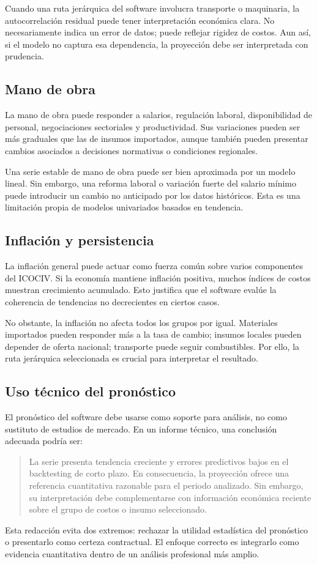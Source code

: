 Cuando una ruta jerárquica del software involucra transporte o maquinaria, la autocorrelación residual puede tener interpretación económica clara. No necesariamente indica un error de datos; puede reflejar rigidez de costos. Aun así, si el modelo no captura esa dependencia, la proyección debe ser interpretada con prudencia.

\subsection{Mano de obra}

La mano de obra puede responder a salarios, regulación laboral, disponibilidad de personal, negociaciones sectoriales y productividad. Sus variaciones pueden ser más graduales que las de insumos importados, aunque también pueden presentar cambios asociados a decisiones normativas o condiciones regionales.

Una serie estable de mano de obra puede ser bien aproximada por un modelo lineal. Sin embargo, una reforma laboral o variación fuerte del salario mínimo puede introducir un cambio no anticipado por los datos históricos. Esta es una limitación propia de modelos univariados basados en tendencia.

\subsection{Inflación y persistencia}

La inflación general puede actuar como fuerza común sobre varios componentes del ICOCIV. Si la economía mantiene inflación positiva, muchos índices de costos muestran crecimiento acumulado. Esto justifica que el software evalúe la coherencia de tendencias no decrecientes en ciertos casos.

No obstante, la inflación no afecta todos los grupos por igual. Materiales importados pueden responder más a la tasa de cambio; insumos locales pueden depender de oferta nacional; transporte puede seguir combustibles. Por ello, la ruta jerárquica seleccionada es crucial para interpretar el resultado.

\subsection{Uso técnico del pronóstico}

El pronóstico del software debe usarse como soporte para análisis, no como sustituto de estudios de mercado. En un informe técnico, una conclusión adecuada podría ser:

\begin{quote}
La serie presenta tendencia creciente y errores predictivos bajos en el backtesting de corto plazo. En consecuencia, la proyección ofrece una referencia cuantitativa razonable para el periodo analizado. Sin embargo, su interpretación debe complementarse con información económica reciente sobre el grupo de costos o insumo seleccionado.
\end{quote}

Esta redacción evita dos extremos: rechazar la utilidad estadística del pronóstico o presentarlo como certeza contractual. El enfoque correcto es integrarlo como evidencia cuantitativa dentro de un análisis profesional más amplio.
